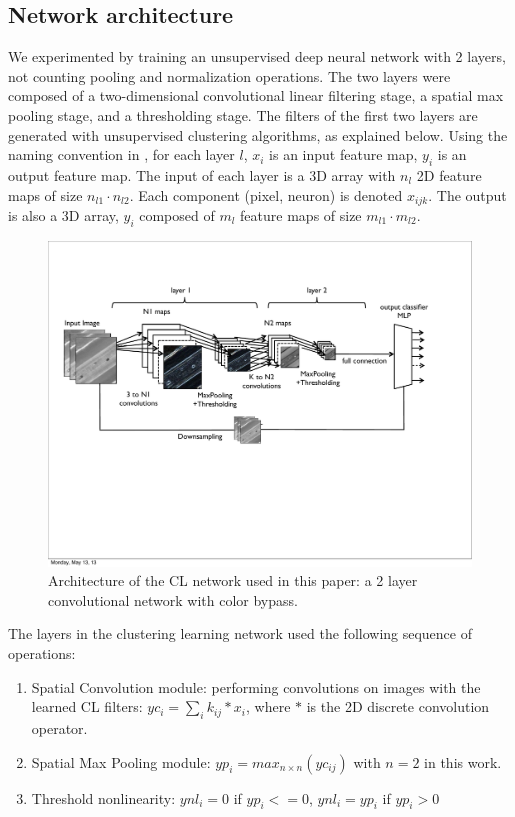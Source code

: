 \documentclass{article} %
\begin{document}
\subsection{Network architecture}
\label{sec-net-arch}

We experimented by training an unsupervised deep neural network with 2 layers, not counting pooling and normalization operations. The two layers were composed of a two-dimensional convolutional linear filtering stage, a spatial max pooling stage, and a thresholding stage. 
The filters of the first two layers are generated with unsupervised clustering algorithms, as explained below. 
Using the naming convention in \cite{lecun_convolutional_2010}, for each layer $l$,  $x_i$ is an input feature map, $y_i$ is an output feature map. The input of each layer is a 3D array with $n_l$ 2D feature maps of size $n_{l1} \cdot n_{l2}$. Each component (pixel, neuron) is denoted $x_{ijk}$. The output is also a 3D array, $y_i$ composed of $m_l$ feature maps of size $m_{l1} \cdot m_{l2}$.


\begin{figure}
\includegraphics[width=5in]{fig-netarch.pdf}
\caption{Architecture of the CL network used in this paper: a 2 layer convolutional network with color bypass.}
\label{fig-netarch}
\end{figure}


The layers in the clustering learning network used the following sequence of operations:
\begin{enumerate}
\item Spatial Convolution module: performing convolutions on images with the learned CL filters: $yc_i=\sum_i{k_{ij}\ast x_i}$, where $\ast$ is the 2D discrete convolution operator.
\item Spatial Max Pooling module: $yp_i = max_{n \times n}(yc_{ij})$ with $n =  2$ in this work.
\item Threshold nonlinearity: $ynl_i = 0$ if $yp_i <= 0$, $ynl_i = yp_i$ if $yp_i > 0$
\end{enumerate}
\end{document}
